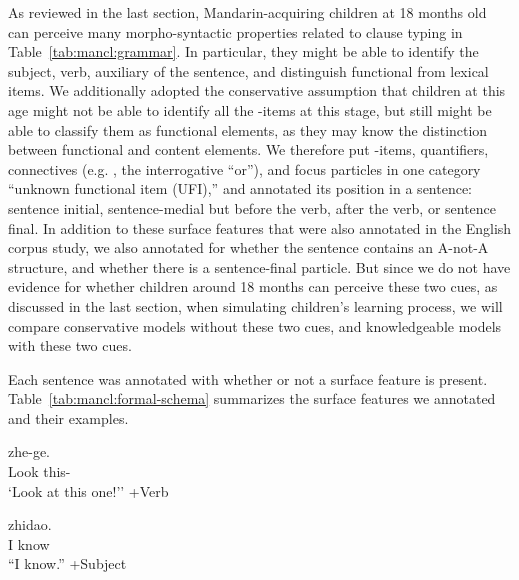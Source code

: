 As reviewed in the last section, Mandarin-acquiring children at 18 months old can perceive many morpho-syntactic properties related to clause typing in Table~\ref{tab:mancl:grammar}. In particular, they might be able to identify the subject, verb, auxiliary of the sentence, and distinguish functional from lexical items. We additionally adopted the conservative assumption that children at this age might not be able to identify all the \twh-items at this stage, but still might be able to classify them as functional elements, as they may know the distinction between functional and content elements. We therefore put \twh-items, quantifiers, connectives (e.g. , the interrogative ``or''), and focus particles in one category ``unknown functional item (UFI),'' and annotated its position in a sentence: sentence initial, sentence-medial but before the verb, after the verb, or sentence final. In addition to these surface features that were also annotated in the English corpus study, we also annotated for whether the sentence contains an A-not-A structure, and whether there is a sentence-final  particle. But since we do not have evidence for whether children around 18 months can perceive these two cues, as discussed in the last section, when simulating children's learning process, we will compare conservative models without these two cues, and knowledgeable models with these two cues.


Each sentence was annotated with whether or not a surface feature is present. Table~\ref{tab:mancl:formal-schema} summarizes the surface features we annotated and their examples.  


\begin{exe} \label{mancl:schema:formal:verb}
\ex 
\gll {} zhe-ge.\\
Look this-\Cl{}\\
\trans `Look at this one!'' \hfill +Verb
\end{exe}

\gll {} zhidao.\\
I know\\
\trans ``I know.'' \hfill +Subject
\eex

